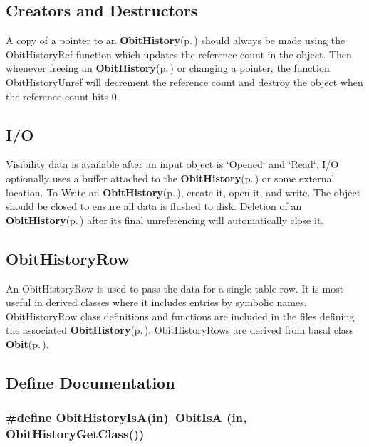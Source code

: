 \subsection{Creators and Destructors}\label{ObitHistory_8h_ObitHistoryaccess}
A copy of a pointer to an {\bf Obit\-History}{\rm (p.\,\pageref{structObitHistory})} should always be made using the Obit\-History\-Ref function which updates the reference count in the object. Then whenever freeing an {\bf Obit\-History}{\rm (p.\,\pageref{structObitHistory})} or changing a pointer, the function Obit\-History\-Unref will decrement the reference count and destroy the object when the reference count hits 0.\subsection{I/O}\label{ObitHistory_8h_ObitHistoryUsage}
Visibility data is available after an input object is \char`\"{}Opened\char`\"{} and \char`\"{}Read\char`\"{}. I/O optionally uses a buffer attached to the {\bf Obit\-History}{\rm (p.\,\pageref{structObitHistory})} or some external location. To Write an {\bf Obit\-History}{\rm (p.\,\pageref{structObitHistory})}, create it, open it, and write. The object should be closed to ensure all data is flushed to disk. Deletion of an {\bf Obit\-History}{\rm (p.\,\pageref{structObitHistory})} after its final unreferencing will automatically close it.\subsection{Obit\-History\-Row}\label{ObitHistory_8h_ObitHistoryRow}
An Obit\-History\-Row is used to pass the data for a single table row. It is most useful in derived classes where it includes entries by symbolic names. Obit\-History\-Row class definitions and functions are included in the files defining the associated {\bf Obit\-History}{\rm (p.\,\pageref{structObitHistory})}. Obit\-History\-Rows are derived from basal class {\bf Obit}{\rm (p.\,\pageref{structObit})}.

\subsection{Define Documentation}
\subsubsection{\setlength{\rightskip}{0pt plus 5cm}\#define Obit\-History\-Is\-A(in)\ Obit\-Is\-A (in, Obit\-History\-Get\-Class())}\label{ObitHistory_8h_a2}


